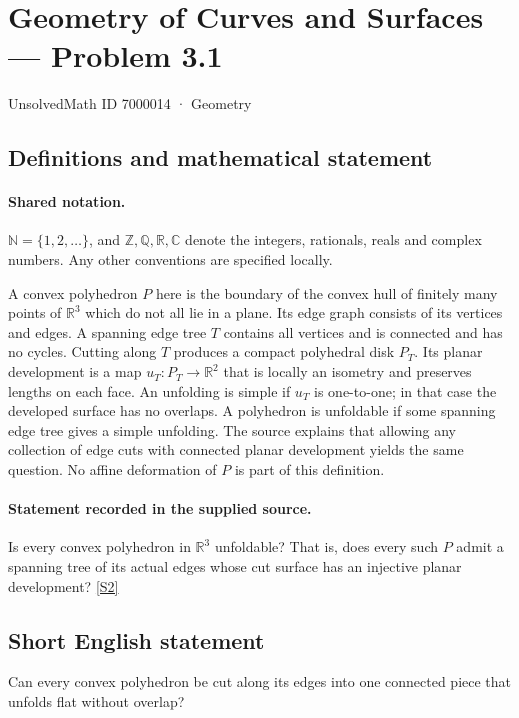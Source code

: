 \documentclass[11pt]{article}
\newcommand{\sref}[2]{\hyperlink{source:#1:#2}{[S#2]}}
\begin{document}
\setcounter{section}{7000013}
\section{Geometry of Curves and Surfaces — Problem 3.1}\label{7000014}
{\small\sffamily UnsolvedMath ID 7000014 · Geometry}
\subsection{Definitions and mathematical statement}

\paragraph{Shared notation.}$\mathbb N=\{1,2,\ldots\}$, and $\mathbb Z,\mathbb Q,\mathbb R,\mathbb C$ denote the integers, rationals, reals and complex numbers. Any other conventions are specified locally.


A convex polyhedron $P$ here is the boundary of the convex hull of finitely many points of $\mathbb R^3$ which do not all lie in a plane. Its edge graph consists of its vertices and edges. A spanning edge tree $T$ contains all vertices and is connected and has no cycles. Cutting along $T$ produces a compact polyhedral disk $P_T$. Its planar development is a map $u_T:P_T\to\mathbb R^2$ that is locally an isometry and preserves lengths on each face. An unfolding is simple if $u_T$ is one-to-one; in that case the developed surface has no overlaps. A polyhedron is unfoldable if some spanning edge tree gives a simple unfolding. The source explains that allowing any collection of edge cuts with connected planar development yields the same question. No affine deformation of $P$ is part of this definition.
\paragraph{Statement recorded in the supplied source.}
Is every convex polyhedron in $\mathbb R^3$ unfoldable? That is, does every such $P$ admit a spanning tree of its actual edges whose cut surface has an injective planar development? \sref{7000014}{2}
\subsection{Short English statement}
Can every convex polyhedron be cut along its edges into one connected piece that unfolds flat without overlap?
\end{document}
